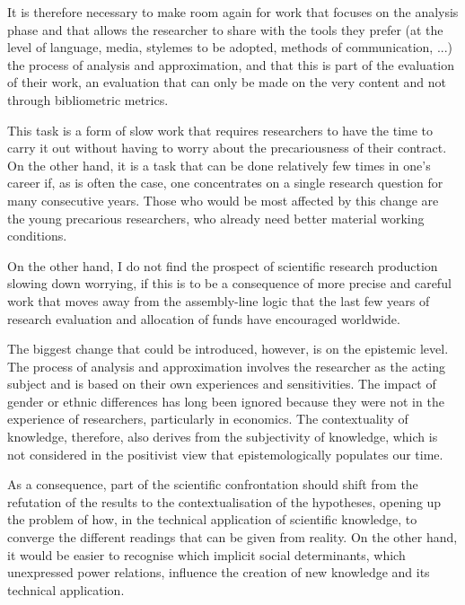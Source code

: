 It is therefore necessary to make room again for work that focuses on the analysis phase and that allows the researcher to share with the tools they prefer (at the level of language, media, stylemes to be adopted, methods of communication, ...) the process of analysis and approximation, and that this is part of the evaluation of their work, an evaluation that can only be made on the very content and not through bibliometric metrics.

This task is a form of slow work that requires researchers to have the time to carry it out without having to worry about the precariousness of their contract. On the other hand, it is a task that can be done relatively few times in one's career if, as is often the case, one concentrates on a single research question for many consecutive years.
Those who would be most affected by this change are the young precarious researchers, who already need better material working conditions.

On the other hand, I do not find the prospect of scientific research production slowing down worrying, if this is to be a consequence of more precise and careful work that moves away from the assembly-line logic that the last few years of research evaluation and allocation of funds have encouraged worldwide.

The biggest change that could be introduced, however, is on the epistemic level.
The process of analysis and approximation involves the researcher as the acting subject and is based on their own experiences and sensitivities.
The impact of gender or ethnic differences has long been ignored because they were not in the experience of researchers, particularly in economics.
The contextuality of knowledge, therefore, also derives from the subjectivity of knowledge, which is not considered in the positivist view that epistemologically populates our time.

As a consequence, part of the scientific confrontation should shift from the refutation of the results to the contextualisation of the hypotheses, opening up the problem of how, in the technical application of scientific knowledge, to converge the different readings that can be given from reality.
On the other hand, it would be easier to recognise which implicit social determinants, which unexpressed power relations, influence the creation of new knowledge and its technical application.

